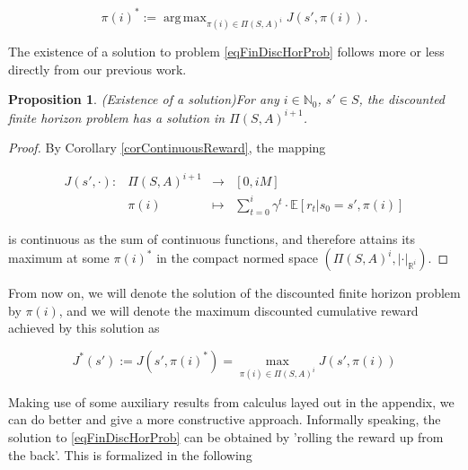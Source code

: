 \documentclass[11pt]{article} %
\newtheorem{prop}{Proposition}
\DeclareMathOperator*{\argmax}{arg\,max}
\begin{document}
\begin{equation}\label{eqFinDiscHorProb}
	\pi(i)^* := \argmax_{\pi(i) \in \Pi(S,A)^i} J(s',\pi(i)).
\end{equation}

The existence of a solution to problem \ref{eqFinDiscHorProb} follows more or less directly from our previous work.

\begin{prop}(Existence of a solution)\label{lemExistenceFiniteSolution}
	For any $i \in \mathbb{N}_0$, $s' \in S$, the discounted finite horizon problem has a solution in $\Pi(S,A)^{i+1}$.
\end{prop}

\begin{proof}
By Corollary \ref{corContinuousReward}, the mapping 

\begin{equation}\label{contDiscExpRewSumMap}
	\begin{array}{rccl}
		J(s',\cdot): 	& \Pi(S,A)^{i+1} 	& \rightarrow 	& [0,i M] \\
					& \pi(i)		& \mapsto 	& \sum_{t=0}^i \gamma^t \cdot \mathbb{E}[ r_t | s_0 = s', \pi(i)]
	\end{array}
\end{equation}

is continuous as the sum of continuous functions, and therefore attains its maximum at some $\pi(i)^*$ in the compact normed space $(\Pi(S,A)^i,|\cdot|_{\mathbb{R}^i})$.
\end{proof}

From now on, we will denote the solution of the discounted finite horizon problem by $\pi(i)$, and we will denote the maximum discounted cumulative reward achieved by this solution as 

\begin{equation}
	J^*(s') := J(s',\pi(i)^*) = \max_{\pi(i) \in \Pi(S,A)^i} J(s',\pi(i))
\end{equation}

Making use of some auxiliary results from calculus layed out in the appendix, we can do better and give a more constructive approach. Informally speaking, the solution to \ref{eqFinDiscHorProb} can be obtained by 'rolling the reward up from the back'. This is formalized in the following
\end{document}
